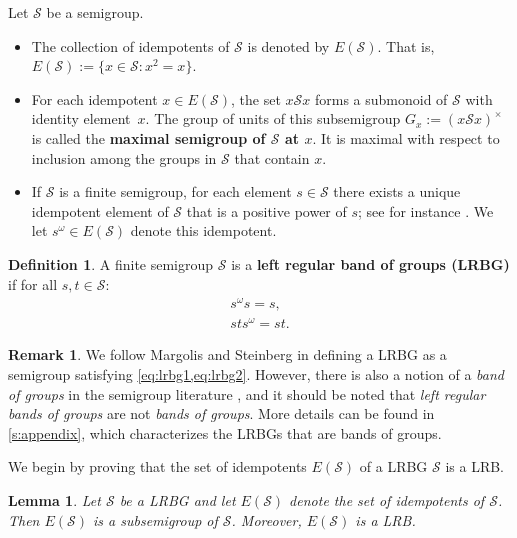 \documentclass[11pt, oneside, reqno]{amsart}
\newtheorem{lemma}[theorem]{Lemma}
\theoremstyle{definition}
\newtheorem{definition}[theorem]{Definition}
\newtheorem{remark}[theorem]{Remark}
\numberwithin{equation}{section}
\newcommand{\defn}[1]{{\color{RoyalBlue}\bf#1}}
\def \SS{{\mathcal{S}}}
\begin{document}
Let $\SS$ be a semigroup.
\begin{itemize}
    \item
        The collection of idempotents of $\SS$ is denoted by $E(\SS)$.
        That is, $E(\SS) := \{ x \in \SS : x^2 = x \}$.
    \item
        For each idempotent $x \in E(\SS)$, the set $x \SS x$ forms a submonoid of $\SS$ with identity element~$x$.
        The group of units of this subsemigroup $G_x := (x \SS x)^\times$ is called the \defn{maximal semigroup of $\SS$ at $x$}.
        It is maximal with respect to inclusion among the groups in $\SS$ that contain $x$.
    \item
        If $\SS$ is a finite semigroup, for each element $s \in \SS$ there exists
        a unique idempotent element of $\SS$ that is a positive power of $s$; see for instance \cite[Corollary 1.2]{steinberg16monoids}.
        We let $s^\omega \in E(\SS)$ denote this idempotent.
\end{itemize}

\begin{definition} \label{defn:LRBG}
    A finite semigroup $\SS$ is a \defn{left regular band of groups (LRBG)} if for all $s,t \in \SS$:
    \begin{align}
        \label{eq:lrbg1}\tag{LRBG1}     s^\omega s = s,         \\
        \label{eq:lrbg2}\tag{LRBG2}     s t s^\omega = s t.
    \end{align}
\end{definition}

\begin{remark}
    We follow Margolis and Steinberg \cite{ms11HomologySemigroups} in defining
    a LRBG as a semigroup satisfying \cref{eq:lrbg1,eq:lrbg2}.
    However, there is also a notion of a \emph{band of groups} in the semigroup
    literature \cite{clifford, cp61semigroupsI},
    and it should be noted that \emph{left regular bands of groups} are not
    \emph{bands of groups}.
    More details can be found in \cref{s:appendix}, which characterizes the
    LRBGs that are bands of groups.
\end{remark}

We begin by proving that the set of idempotents $E(\SS)$ of a LRBG $\SS$ is a LRB.

\begin{lemma}
    \label{E(S)-is-a-LRB}
    Let $\SS$ be a LRBG and let $E(\SS)$ denote the set of idempotents of $\SS$.
    Then $E(\SS)$ is a subsemigroup of $\SS$. Moreover, $E(\SS)$ is a LRB.
\end{lemma}
\end{document}
